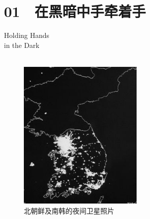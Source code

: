 \fancyhead[RO]{{\tiny{\textcolor{Gray}{\FA \ }}}\thepage}
\fancyhead[LE]{{\tiny{\textcolor{Gray}{\FA \ }}}\thepage}
\fancyfoot[LE,RO]{}
\fancyfoot[LO,CE]{}
\fancyfoot[CO,RE]{}
\renewcommand{\baselinestretch}{1.0}  %
\chapter*{01 {\FA } 在黑暗中手牵着手}
\vspace{5mm}
\begin{flushright}
	\textcolor{PinYinColor}{\EN \huge{Holding Hands\\
		in the Dark\\
	\ \\}}
\end{flushright}
\begin{figure}[!htbp]
	\centering
	\includegraphics[width=6cm]{./Chapters/Images/01.jpg}
	\caption*{北朝鲜及南韩的夜间卫星照片}
\end{figure}


